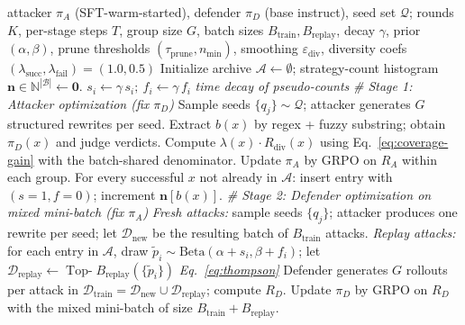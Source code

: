 \documentclass{article}
\newcommand{\method}{\textsc{DACE}\xspace}
\newcommand{\piA}{\pi_A}
\newcommand{\piD}{\pi_D}
\newcommand{\archive}{\mathcal{A}}
\newcommand{\strategyspace}{\mathcal{B}}
\begin{document}
\begin{algorithm}[h]
  \caption{\method training loop (full)}
  \label{alg:dace-full}
  \begin{algorithmic}[1]
    \REQUIRE attacker $\piA$ (SFT-warm-started), defender $\piD$ (base instruct), seed set $\mathcal{Q}$; rounds $K$, per-stage steps $T$, group size $G$, batch sizes $B_{\mathrm{train}},B_{\mathrm{replay}}$, decay $\gamma$, prior $(\alpha,\beta)$, prune thresholds $(\tau_{\mathrm{prune}}, n_{\min})$, smoothing $\varepsilon_{\mathrm{div}}$, diversity coefs $(\lambda_{\mathrm{succ}}, \lambda_{\mathrm{fail}})=(1.0, 0.5)$
    \STATE Initialize archive $\archive \leftarrow \emptyset$; strategy-count histogram $\mathbf{n}\in\mathbb{N}^{|\strategyspace|}\leftarrow\mathbf{0}$.
      \FOR{each $x_i \in \archive$}
        \STATE $s_i \leftarrow \gamma\,s_i;\ f_i \leftarrow \gamma\,f_i$ \hfill\textit{time decay of pseudo-counts}
      \ENDFOR
      \STATE \textit{\# Stage 1: Attacker optimization (fix $\piD$)}
        \STATE Sample seeds $\{q_j\}\sim\mathcal{Q}$; attacker generates $G$ structured rewrites per seed.
        \STATE Extract $b(x)$ by regex + fuzzy substring; obtain $\piD(x)$ and judge verdicts.
        \STATE Compute $\lambda(x)\cdot R_{\mathrm{div}}(x)$ using Eq.~\ref{eq:coverage-gain} with the batch-shared denominator.
        \STATE Update $\piA$ by GRPO on $R_A$ within each group.
        \STATE For every successful $x$ not already in $\archive$: insert entry with $(s{=}1, f{=}0)$; increment $\mathbf{n}[b(x)]$.
      \ENDFOR
      \STATE \textit{\# Stage 2: Defender optimization on mixed mini-batch (fix $\piA$)}
        \STATE \textit{Fresh attacks:} sample seeds $\{q_j\}$; attacker produces one rewrite per seed; let $\mathcal{D}_{\mathrm{new}}$ be the resulting batch of $B_{\mathrm{train}}$ attacks.
        \STATE \textit{Replay attacks:} for each entry in $\archive$, draw $\tilde p_i \sim \mathrm{Beta}(\alpha+s_i,\beta+f_i)$; let $\mathcal{D}_{\mathrm{replay}}\leftarrow \operatorname{Top-}B_{\mathrm{replay}}(\{\tilde p_i\})$ \hfill\textit{Eq.~\ref{eq:thompson}}
        \STATE Defender generates $G$ rollouts per attack in $\mathcal{D}_{\mathrm{train}}\!=\!\mathcal{D}_{\mathrm{new}}\cup\mathcal{D}_{\mathrm{replay}}$; compute $R_D$.
        \STATE Update $\piD$ by GRPO on $R_D$ with the mixed mini-batch of size $B_{\mathrm{train}}+B_{\mathrm{replay}}$.

\end{algorithmic}
\end{algorithm}
\end{document}
